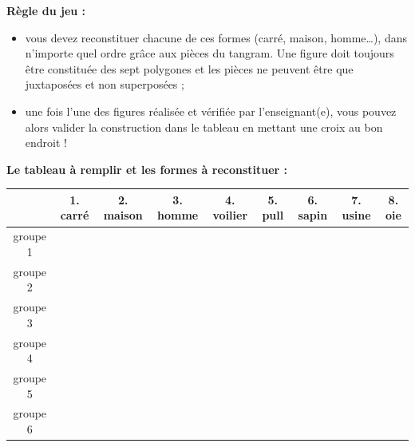 \begin{exercice*}
{\bf Règle du jeu :}
\begin{itemize}
   \item vous devez reconstituer chacune de ces formes (carré, maison, homme\dots{}), dans n'importe quel ordre grâce aux pièces du tangram. Une figure doit toujours être constituée des sept polygones et les pièces ne peuvent être que juxtaposées et non superposées ;
   \item une fois l'une des figures réalisée et vérifiée par l'enseignant(e), vous pouvez alors valider la construction dans le tableau en mettant une croix au bon endroit ! \\
\end{itemize}
   
{\bf Le tableau à remplir et les formes à reconstituer :} \\ [2mm]
{\renewcommand{\arraystretch}{1.5}
\begin{tabular}{|c|*{8}{C{1.5}|}}
  \hline
  & 1. carré &  2. maison & 3. homme & 4. voilier & 5. pull & 6. sapin & 7. usine & 8. oie \\
  \hline
  groupe 1 & & & & & & & & \\
  \hline
  groupe 2 & & & & & & & & \\
  \hline
  groupe 3 & & & & & & & & \\
  \hline
  groupe 4 & & & & & & & & \\
  \hline
  groupe 5 & & & & & & & & \\
  \hline
  groupe 6 & & & & & & & & \\
  \hline
\end{tabular}}

\pagebreak


\end{exercice*}
